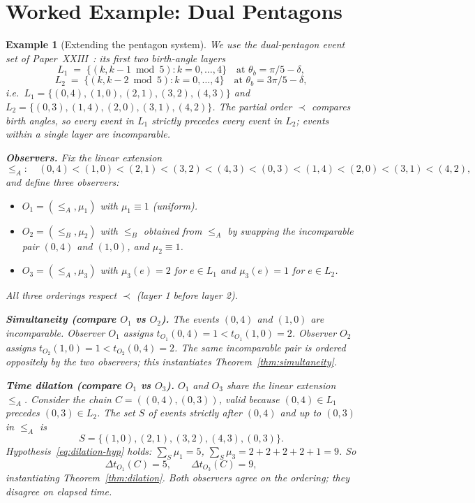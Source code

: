 \documentclass[12pt]{article}
\newtheorem{example}[theorem]{Example}
\begin{document}
\section{Worked Example: Dual Pentagons}\label{sec:example}

\begin{example}[Extending the pentagon system]\label{ex:pentagon}
We use the dual-pentagon event set of Paper~XXIII~\citep{SmartXXIII}: its first two birth-angle layers
\[
    L_1 \;=\; \{(k, k-1 \bmod 5) : k=0,\dots,4\} \quad \text{at } \theta_b = \pi/5 - \delta,
\]
\[
    L_2 \;=\; \{(k, k-2 \bmod 5) : k=0,\dots,4\} \quad \text{at } \theta_b = 3\pi/5 - \delta,
\]
i.e.\ $L_1 = \{(0,4),(1,0),(2,1),(3,2),(4,3)\}$ and $L_2 = \{(0,3),(1,4),(2,0),(3,1),(4,2)\}$. The partial order $\prec$ compares birth angles, so every event in $L_1$ strictly precedes every event in $L_2$; events within a single layer are incomparable.

\textbf{Observers.} Fix the linear extension
\[
    \leq_A:\quad (0,4) < (1,0) < (2,1) < (3,2) < (4,3) < (0,3) < (1,4) < (2,0) < (3,1) < (4,2),
\]
and define three observers:
\begin{itemize}
    \item $O_1 = (\leq_A, \mu_1)$ with $\mu_1 \equiv 1$ (uniform).
    \item $O_2 = (\leq_B, \mu_2)$ with $\leq_B$ obtained from $\leq_A$ by swapping the incomparable pair $(0,4)$ and $(1,0)$, and $\mu_2 \equiv 1$.
    \item $O_3 = (\leq_A, \mu_3)$ with $\mu_3(e) = 2$ for $e \in L_1$ and $\mu_3(e) = 1$ for $e \in L_2$.
\end{itemize}
All three orderings respect $\prec$ (layer 1 before layer 2).

\textbf{Simultaneity (compare $O_1$ vs $O_2$).} The events $(0,4)$ and $(1,0)$ are incomparable. Observer $O_1$ assigns $t_{O_1}(0,4) = 1 < t_{O_1}(1,0) = 2$. Observer $O_2$ assigns $t_{O_2}(1,0) = 1 < t_{O_2}(0,4) = 2$. The same incomparable pair is ordered oppositely by the two observers; this instantiates Theorem~\ref{thm:simultaneity}.

\textbf{Time dilation (compare $O_1$ vs $O_3$).} $O_1$ and $O_3$ share the linear extension $\leq_A$. Consider the chain $C = ((0,4), (0,3))$, valid because $(0,4) \in L_1$ precedes $(0,3) \in L_2$. The set $S$ of events strictly after $(0,4)$ and up to $(0,3)$ in $\leq_A$ is
\[
    S = \{(1,0),(2,1),(3,2),(4,3),(0,3)\}.
\]
Hypothesis~\eqref{eq:dilation-hyp} holds: $\sum_S \mu_1 = 5$, $\sum_S \mu_3 = 2+2+2+2+1 = 9$. So
\[
    \Delta t_{O_1}(C) = 5, \qquad \Delta t_{O_3}(C) = 9,
\]
instantiating Theorem~\ref{thm:dilation}. Both observers agree on the ordering; they disagree on elapsed time.


\end{example}
\end{document}
